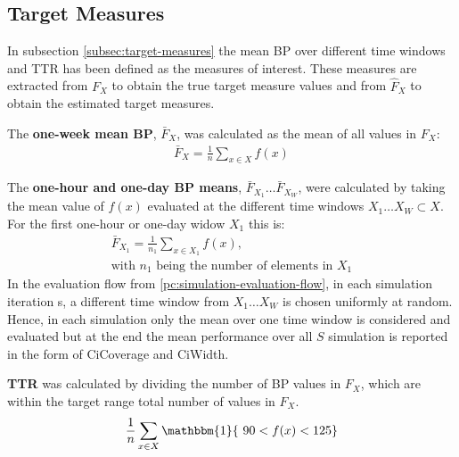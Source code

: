 \subsection{Target Measures}
In subsection \ref{subsec:target-measures} the mean BP over different time
windows and TTR has been defined as the measures of interest. These measures
are extracted from $F_X$ to obtain the true target measure values and
from $\hat{F}_X$ to obtain the estimated target measures.

The \textbf{one-week mean BP}, $\bar{F}_X$, was calculated as the mean of all values in
$F_X$:
\begin{gather*}
    \bar{F}_{X} = \frac{1}{n} \sum_{x \in X} f(x)
\end{gather*}

The \textbf{one-hour and one-day BP means}, $\bar{F}_{X_1} \dots \bar{F}_{X_W}$,
were calculated by taking the mean value of $f(x)$ evaluated at the different
time windows $X_1 \dots X_W \subset X$.
For the first one-hour or one-day widow $X_1$ this is:
\begin{gather*}
    \bar{F}_{X_1} = \frac{1}{n_1} \sum_{x \in X_1} f(x), \\
    \text{with $n_1$ being the number of elements in $X_1$}
\end{gather*}
In the evaluation flow from \ref{pc:simulation-evaluation-flow}, in
each simulation iteration s, a different time window from
$X_1 \dots X_W$ is chosen uniformly at random.
Hence, in each simulation
only the mean over one time window is considered and evaluated
but at the end the mean performance over all $S$ simulation is reported in
the form of CiCoverage and CiWidth.


\textbf{TTR} was calculated by dividing the number of BP values in $F_X$,
which are within the target range total number of values in $F_X$.
\begin{gather*}
    \frac{1}{n} \sum_{x \in X} \mathbbm{1}\{\ 90 < f(x) < 125 \}
\end{gather*}




